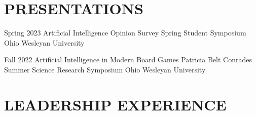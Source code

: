 \documentclass[10pt, letterpaper]{article}
\begin{document}
\vspace{\headerSpacing}

\section{PRESENTATIONS}

\begin{presentationentry}
    {Spring 2023} %
    {Artificial Intelligence Opinion Survey} %
    {Spring Student Symposium} %
    {Ohio Wesleyan University} %
\end{presentationentry}

\begin{presentationentry}
    {Fall 2022} %
    {Artificial Intelligence in Modern Board Games} %
    {Patricia Belt Conrades Summer Science Research Symposium} %
    {Ohio Wesleyan University} %
\end{presentationentry}

\vspace{\headerSpacing}

\section{LEADERSHIP EXPERIENCE}
\end{document}
